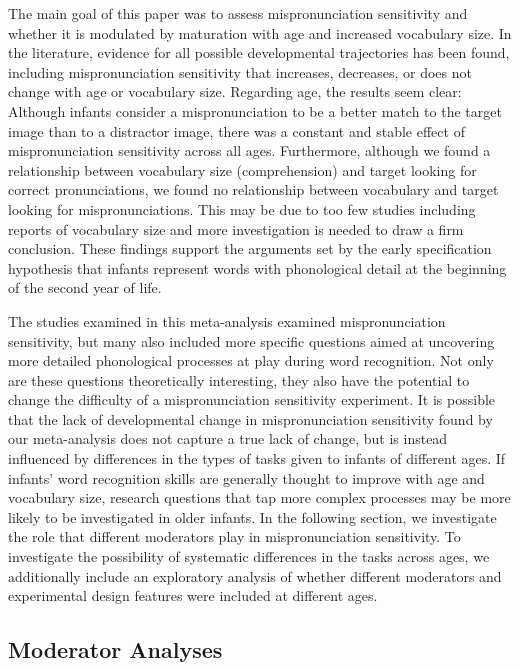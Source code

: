 \documentclass[man]{apa6}
\begin{document}
The main goal of this paper was to assess mispronunciation sensitivity and whether it is modulated by maturation with age and increased vocabulary size. In the literature, evidence for all possible developmental trajectories has been found, including mispronunciation sensitivity that increases, decreases, or does not change with age or vocabulary size. Regarding age, the results seem clear: Although infants consider a mispronunciation to be a better match to the target image than to a distractor image, there was a constant and stable effect of mispronunciation sensitivity across all ages. Furthermore, although we found a relationship between vocabulary size (comprehension) and target looking for correct pronunciations, we found no relationship between vocabulary and target looking for mispronunciations. This may be due to too few studies including reports of vocabulary size and more investigation is needed to draw a firm conclusion. These findings support the arguments set by the early specification hypothesis that infants represent words with phonological detail at the beginning of the second year of life.

The studies examined in this meta-analysis examined mispronunciation sensitivity, but many also included more specific questions aimed at uncovering more detailed phonological processes at play during word recognition. Not only are these questions theoretically interesting, they also have the potential to change the difficulty of a mispronunciation sensitivity experiment. It is possible that the lack of developmental change in mispronunciation sensitivity found by our meta-analysis does not capture a true lack of change, but is instead influenced by differences in the types of tasks given to infants of different ages. If infants' word recognition skills are generally thought to improve with age and vocabulary size, research questions that tap more complex processes may be more likely to be investigated in older infants. In the following section, we investigate the role that different moderators play in mispronunciation sensitivity. To investigate the possibility of systematic differences in the tasks across ages, we additionally include an exploratory analysis of whether different moderators and experimental design features were included at different ages.

\hypertarget{moderator-analyses}{%
\subsection{Moderator Analyses}\label{moderator-analyses}}
\end{document}
